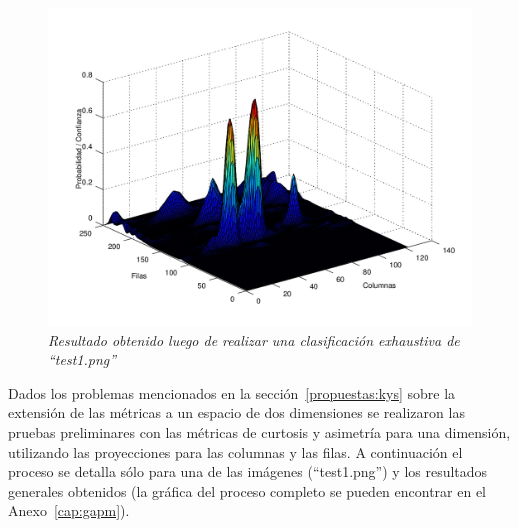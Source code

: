 \begin{figure}[htc]
  \centering
  \includegraphics[scale=.6]{images/resultado_ejemplo}
  \caption{\em Resultado obtenido luego de realizar una clasificación exhaustiva de ``test1.png''}  
  \label{fig:ejemploresultado}
\end{figure}

Dados los problemas mencionados en la sección~\ref{propuestas:kys} sobre la extensión de las métricas a un espacio de dos dimensiones se realizaron las pruebas preliminares con las métricas de curtosis y asimetría para una dimensión, utilizando las proyecciones para las columnas y las filas. A continuación el proceso se detalla sólo para una de las imágenes (``test1.png'') y los resultados generales obtenidos (la gráfica del proceso completo se pueden encontrar en el Anexo~\ref{cap:gapm}).

